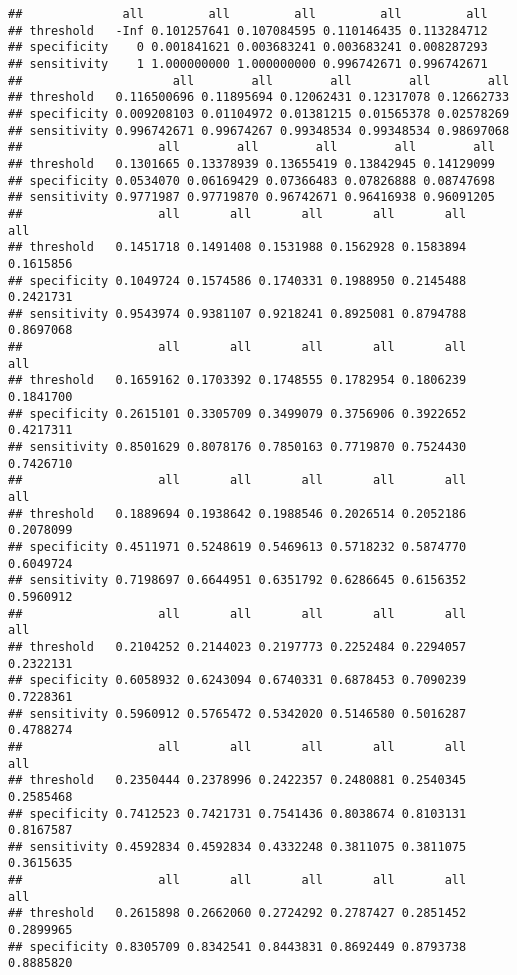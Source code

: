 \documentclass[]{article}
\begin{document}
\begin{verbatim}
##              all         all         all         all         all
## threshold   -Inf 0.101257641 0.107084595 0.110146435 0.113284712
## specificity    0 0.001841621 0.003683241 0.003683241 0.008287293
## sensitivity    1 1.000000000 1.000000000 0.996742671 0.996742671
##                     all        all        all        all        all
## threshold   0.116500696 0.11895694 0.12062431 0.12317078 0.12662733
## specificity 0.009208103 0.01104972 0.01381215 0.01565378 0.02578269
## sensitivity 0.996742671 0.99674267 0.99348534 0.99348534 0.98697068
##                   all        all        all        all        all
## threshold   0.1301665 0.13378939 0.13655419 0.13842945 0.14129099
## specificity 0.0534070 0.06169429 0.07366483 0.07826888 0.08747698
## sensitivity 0.9771987 0.97719870 0.96742671 0.96416938 0.96091205
##                   all       all       all       all       all       all
## threshold   0.1451718 0.1491408 0.1531988 0.1562928 0.1583894 0.1615856
## specificity 0.1049724 0.1574586 0.1740331 0.1988950 0.2145488 0.2421731
## sensitivity 0.9543974 0.9381107 0.9218241 0.8925081 0.8794788 0.8697068
##                   all       all       all       all       all       all
## threshold   0.1659162 0.1703392 0.1748555 0.1782954 0.1806239 0.1841700
## specificity 0.2615101 0.3305709 0.3499079 0.3756906 0.3922652 0.4217311
## sensitivity 0.8501629 0.8078176 0.7850163 0.7719870 0.7524430 0.7426710
##                   all       all       all       all       all       all
## threshold   0.1889694 0.1938642 0.1988546 0.2026514 0.2052186 0.2078099
## specificity 0.4511971 0.5248619 0.5469613 0.5718232 0.5874770 0.6049724
## sensitivity 0.7198697 0.6644951 0.6351792 0.6286645 0.6156352 0.5960912
##                   all       all       all       all       all       all
## threshold   0.2104252 0.2144023 0.2197773 0.2252484 0.2294057 0.2322131
## specificity 0.6058932 0.6243094 0.6740331 0.6878453 0.7090239 0.7228361
## sensitivity 0.5960912 0.5765472 0.5342020 0.5146580 0.5016287 0.4788274
##                   all       all       all       all       all       all
## threshold   0.2350444 0.2378996 0.2422357 0.2480881 0.2540345 0.2585468
## specificity 0.7412523 0.7421731 0.7541436 0.8038674 0.8103131 0.8167587
## sensitivity 0.4592834 0.4592834 0.4332248 0.3811075 0.3811075 0.3615635
##                   all       all       all       all       all       all
## threshold   0.2615898 0.2662060 0.2724292 0.2787427 0.2851452 0.2899965
## specificity 0.8305709 0.8342541 0.8443831 0.8692449 0.8793738 0.8885820

\end{verbatim}
\end{document}

